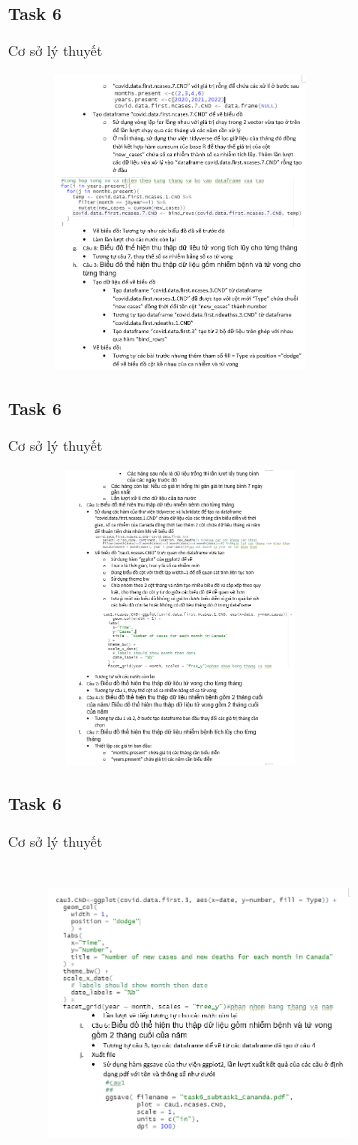\documentclass[english,10pt,table]{beamer}
\begin{document}
\frame
{
    \frametitle{Task 6}
    \begin{block}{Cơ sở lý thuyết}
    \begin{figure}[H]
		\centering
		\includegraphics[height=7.8cm,width=7cm]{images/6.0.1.png}
	\end{figure}
    \end{block}
}
\frame
{
    \frametitle{Task 6}
    \begin{block}{Cơ sở lý thuyết}
    \begin{figure}[H]
		\centering
		\includegraphics[height=7.8cm,width=7cm]{images/6.0.2.png}
	\end{figure}
    \end{block}
}
\frame
{
    \frametitle{Task 6}
    \begin{block}{Cơ sở lý thuyết}
    \begin{figure}[H]
		\centering
		\includegraphics[height=7.8cm,width=8cm]{images/6.0.3.png}
	\end{figure}
    \end{block}
}
\end{document}
